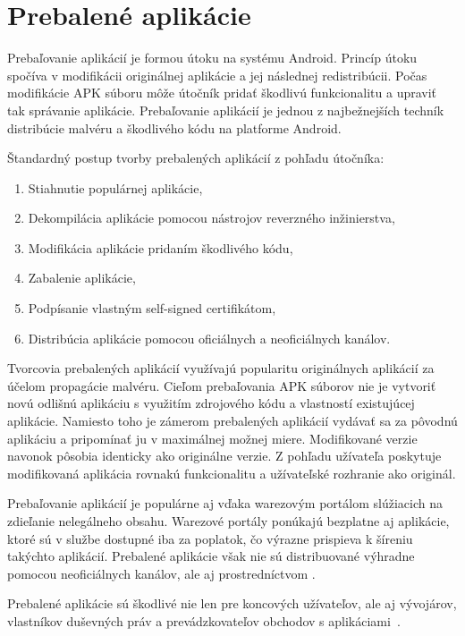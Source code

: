 \chapter{Prebalené aplikácie}
\label{chap:repackaging}
Prebaľovanie aplikácií je formou útoku na systému Android. Princíp útoku spočíva v modifikácii originálnej aplikácie a jej následnej redistribúcii. Počas modifikácie APK súboru môže útočník pridať škodlivú funkcionalitu a upraviť tak správanie aplikácie.
Prebaľovanie aplikácií je jednou z najbežnejších techník distribúcie malvéru a škodlivého kódu na platforme Android. 

Štandardný postup tvorby prebalených aplikácií z pohľadu útočníka:
\begin{enumerate}
	\item Stiahnutie populárnej aplikácie,
	\item Dekompilácia aplikácie pomocou nástrojov reverzného inžinierstva,
	\item Modifikácia aplikácie pridaním škodlivého kódu,
	\item Zabalenie aplikácie,
	\item Podpísanie vlastným self-signed certifikátom,
	\item Distribúcia aplikácie pomocou oficiálnych a neoficiálnych kanálov.
\end{enumerate}

Tvorcovia prebalených aplikácií využívajú popularitu originálnych aplikácií za účelom propagácie malvéru. Cieľom prebaľovania APK súborov nie je vytvoriť novú odlišnú aplikáciu s využitím zdrojového kódu a vlastností existujúcej aplikácie. Namiesto toho je zámerom prebalených aplikácií vydávať sa za pôvodnú aplikáciu a pripomínať ju v maximálnej možnej miere. Modifikované verzie navonok pôsobia identicky ako originálne verzie. Z pohľadu užívateľa poskytuje modifikovaná aplikácia rovnakú funkcionalitu a užívateľské rozhranie ako originál. 

Prebaľovanie aplikácií je populárne aj vďaka warezovým portálom slúžiacich na zdieľanie nelegálneho obsahu. Warezové portály ponúkajú bezplatne aj aplikácie, ktoré sú v službe  dostupné iba za poplatok, čo výrazne prispieva k šíreniu takýchto aplikácií. Prebalené aplikácie však nie sú distribuované výhradne pomocou neoficiálnych kanálov, ale aj prostredníctvom .

Prebalené aplikácie sú škodlivé nie len pre koncových užívateľov, ale aj vývojárov, vlastníkov duševných práv a prevádzkovateľov obchodov s aplikáciami~\cite{CloneRelative}. 

